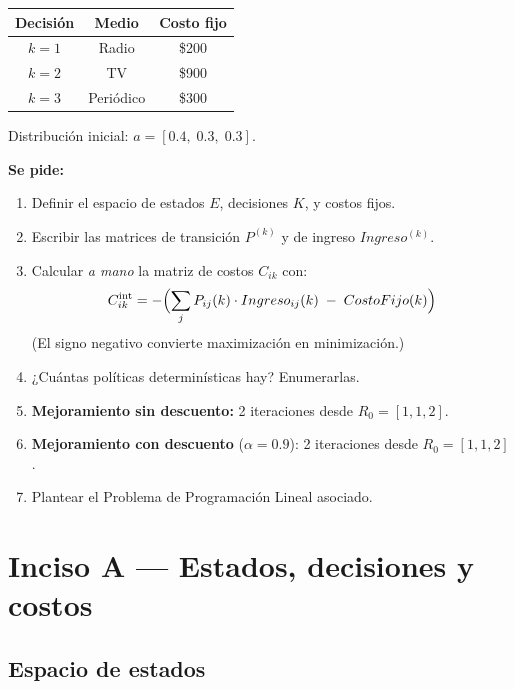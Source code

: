 \documentclass[12pt,a4paper]{article}
\begin{document}
\begin{center}
\begin{tabular}{c c c}
\toprule
\textbf{Decisión} & \textbf{Medio} & \textbf{Costo fijo} \\
\midrule
$k = 1$ & Radio      & \$200 \\
$k = 2$ & TV         & \$900 \\
$k = 3$ & Periódico  & \$300 \\
\bottomrule
\end{tabular}
\end{center}

Distribución inicial: $a = [0.4,\; 0.3,\; 0.3]$.

\vspace{0.3cm}
\textbf{Se pide:}

\begin{enumerate}[\textbf{A)}]
    \item Definir el espacio de estados $E$, decisiones $K$, y costos fijos.
    \item Escribir las matrices de transición $P^{(k)}$ y de ingreso $Ingreso^{(k)}$.
    \item Calcular \textit{a mano} la matriz de costos $C_{ik}$ con:
    \[ C_{ik}^{\text{int}} = -\Bigl( \sum_{j} P_{ij}(k) \cdot Ingreso_{ij}(k) \;-\; CostoFijo(k) \Bigr) \]
    (El signo negativo convierte maximización en minimización.)
    \item ¿Cuántas políticas determinísticas hay? Enumerarlas.
    \item \textbf{Mejoramiento sin descuento:} 2 iteraciones desde $R_0 = [1,1,2]$.
    \item \textbf{Mejoramiento con descuento} ($\alpha = 0.9$): 2 iteraciones desde $R_0 = [1,1,2]$.
    \item Plantear el Problema de Programación Lineal asociado.
\end{enumerate}

\newpage

\section{Inciso A --- Estados, decisiones y costos}

\subsection*{Espacio de estados}
\end{document}

